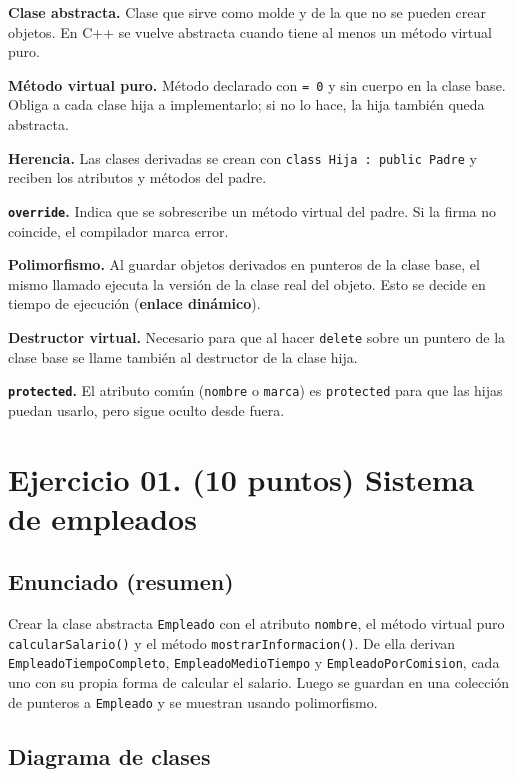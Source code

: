 \documentclass[12pt]{article}
\begin{document}
\textbf{Clase abstracta.} Clase que sirve como molde y de la que no se pueden crear objetos. En C++ se vuelve abstracta cuando tiene al menos un método virtual puro.

\textbf{Método virtual puro.} Método declarado con \texttt{= 0} y sin cuerpo en la clase base. Obliga a cada clase hija a implementarlo; si no lo hace, la hija también queda abstracta.

\textbf{Herencia.} Las clases derivadas se crean con \texttt{class Hija : public Padre} y reciben los atributos y métodos del padre.

\textbf{\texttt{override}.} Indica que se sobrescribe un método virtual del padre. Si la firma no coincide, el compilador marca error.

\textbf{Polimorfismo.} Al guardar objetos derivados en punteros de la clase base, el mismo llamado ejecuta la versión de la clase real del objeto. Esto se decide en tiempo de ejecución (\textbf{enlace dinámico}).

\textbf{Destructor virtual.} Necesario para que al hacer \texttt{delete} sobre un puntero de la clase base se llame también al destructor de la clase hija.

\textbf{\texttt{protected}.} El atributo común (\texttt{nombre} o \texttt{marca}) es \texttt{protected} para que las hijas puedan usarlo, pero sigue oculto desde fuera.

\section{Ejercicio 01. (10 puntos) Sistema de empleados}

\subsection*{Enunciado (resumen)}
Crear la clase abstracta \texttt{Empleado} con el atributo \texttt{nombre}, el método virtual puro \texttt{calcularSalario()} y el método \texttt{mostrarInformacion()}. De ella derivan \texttt{EmpleadoTiempoCompleto}, \texttt{EmpleadoMedioTiempo} y \texttt{EmpleadoPorComision}, cada uno con su propia forma de calcular el salario. Luego se guardan en una colección de punteros a \texttt{Empleado} y se muestran usando polimorfismo.

\subsection*{Diagrama de clases}
\end{document}
